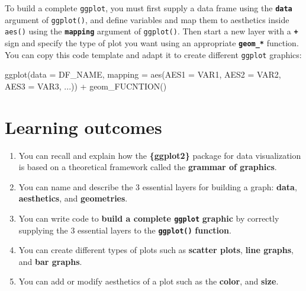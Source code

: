 \documentclass[
  letterpaper,
  DIV=11,
  numbers=noendperiod]{scrreprt}
\newenvironment{Shaded}{\begin{snugshade}}{\end{snugshade}}
\newcommand{\AttributeTok}[1]{\textcolor[rgb]{0.40,0.45,0.13}{#1}}
\newcommand{\FunctionTok}[1]{\textcolor[rgb]{0.28,0.35,0.67}{#1}}
\newcommand{\NormalTok}[1]{\textcolor[rgb]{0.00,0.23,0.31}{#1}}
\newcommand{\SpecialCharTok}[1]{\textcolor[rgb]{0.37,0.37,0.37}{#1}}
\begin{document}
\begin{tcolorbox}[enhanced jigsaw, colframe=quarto-callout-note-color-frame, colbacktitle=quarto-callout-note-color!10!white, titlerule=0mm, opacitybacktitle=0.6, breakable, toprule=.15mm, arc=.35mm, rightrule=.15mm, colback=white, bottomrule=.15mm, opacityback=0, toptitle=1mm, left=2mm, bottomtitle=1mm, title=\textcolor{quarto-callout-note-color}{\faInfo}\hspace{0.5em}{Recap}, leftrule=.75mm, coltitle=black]

To build a complete \texttt{ggplot}, you must first supply a data frame
using the \textbf{\texttt{data}} argument of \texttt{ggplot()}, and
define variables and map them to aesthetics inside \texttt{aes()} using
the \textbf{\texttt{mapping}} argument of \texttt{ggplot()}. Then start
a new layer with a \textbf{\texttt{+}} sign and specify the type of plot
you want using an appropriate \textbf{\texttt{geom\_*}} function. You
can copy this code template and adapt it to create different
\texttt{ggplot} graphics:

\begin{Shaded}
\begin{Highlighting}[]
\FunctionTok{ggplot}\NormalTok{(}\AttributeTok{data =}\NormalTok{ DF\_NAME,}
       \AttributeTok{mapping =} \FunctionTok{aes}\NormalTok{(}\AttributeTok{AES1 =}\NormalTok{ VAR1,}
                     \AttributeTok{AES2 =}\NormalTok{ VAR2, }
                     \AttributeTok{AES3 =}\NormalTok{ VAR3, }
\NormalTok{                     ...)) }\SpecialCharTok{+}
  \FunctionTok{geom\_FUCNTION}\NormalTok{()}
\end{Highlighting}
\end{Shaded}

\end{tcolorbox}

\hypertarget{learning-outcomes}{%
\section{Learning outcomes}\label{learning-outcomes}}

\begin{enumerate}
\def\labelenumi{\arabic{enumi}.}
\item
  You can recall and explain how the \textbf{\{ggplot2\}} package for
  data visualization is based on a theoretical framework called the
  \textbf{grammar of graphics}.
\item
  You can name and describe the 3 essential layers for building a graph:
  \textbf{data}, \textbf{aesthetics}, and \textbf{geometries}.
\item
  You can write code to \textbf{build a complete \texttt{ggplot}}
  \textbf{graphic} by correctly supplying the 3 essential layers to the
  \textbf{\texttt{ggplot()}} \textbf{function}.
\item
  You can create different types of plots such as \textbf{scatter
  plots}, \textbf{line graphs}, and \textbf{bar graphs}.
\item
  You can add or modify aesthetics of a plot such as the \textbf{color},
  and \textbf{size}.
\end{enumerate}
\end{document}
